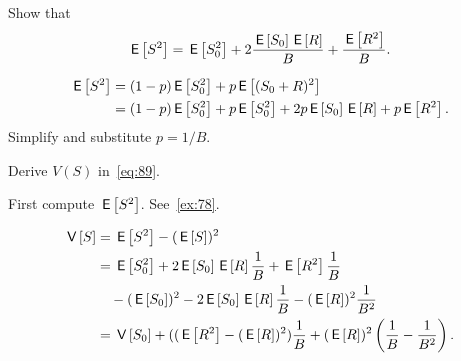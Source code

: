 \begin{extra}
  Show that
  \begin{equation*}
    \E{S^2} = \E{S_0^2} + 2\frac{\E{S_0}\E{R}} B + \frac{\E{R^2}}B.
  \end{equation*}
\begin{solution}
  \begin{align*}
    \E{S^2} 
&= (1-p) \E{S_0^2} + p \E{(S_0+R)^2}\\
&= (1-p) \E{S_0^2} + p \E{S_0^2}  + 2 p \E{S_0} \E R + p \E{R^2}. 
  \end{align*}
  Simplify and substitute $p=1/B$. 
\end{solution}
\end{extra}

\begin{exercise}
Derive $V(S)$ in~\cref{eq:89}.
\begin{hint}
    First compute $\E{S^2}$. See~\cref{ex:78}.
\end{hint}
\begin{solution}
    \begin{equation*}
      \begin{split}
\V{S} 
&=\E{S^2} - (\E{S})^2 \\
&= \E{S_0^2} + 2 \E{S_0} \E R\frac 1B + \E{R^2}\frac 1B  \\
&\quad - (\E{S_0})^2 - 2\E{S_0}\E R \frac 1 B - (\E R)^2\frac1{B^2}\\
&=  \V{S_0} + ((\E{R^2} - (\E R)^2)\frac 1 B + (\E R)^2\left(\frac 1B - \frac 1{B^2}\right).
      \end{split}
    \end{equation*}
\end{solution}
\end{exercise}







